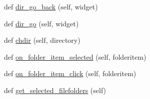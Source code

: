\begin{DoxyCompactItemize}
\item 
def \hyperlink{classremi_1_1gui_1_1FileFolderNavigator_a5f64299c264af76267546db5296e5940}{dir\+\_\+go\+\_\+back} (self, widget)
\item 
def \hyperlink{classremi_1_1gui_1_1FileFolderNavigator_a7c1e11569c677f06a30fe065efff9b0f}{dir\+\_\+go} (self, widget)
\item 
def \hyperlink{classremi_1_1gui_1_1FileFolderNavigator_a68e64ee0d851e42e48e439932d6bd11b}{chdir} (self, directory)
\item 
def \hyperlink{classremi_1_1gui_1_1FileFolderNavigator_a11d7c3e56019d6caada880c1304170dc}{on\+\_\+folder\+\_\+item\+\_\+selected} (self, folderitem)
\item 
def \hyperlink{classremi_1_1gui_1_1FileFolderNavigator_a302e4113c2b897bbf0670dba485e6be9}{on\+\_\+folder\+\_\+item\+\_\+click} (self, folderitem)
\item 
def \hyperlink{classremi_1_1gui_1_1FileFolderNavigator_af2515489544b9461352a6901a872b695}{get\+\_\+selected\+\_\+filefolders} (self)
\end{DoxyCompactItemize}
